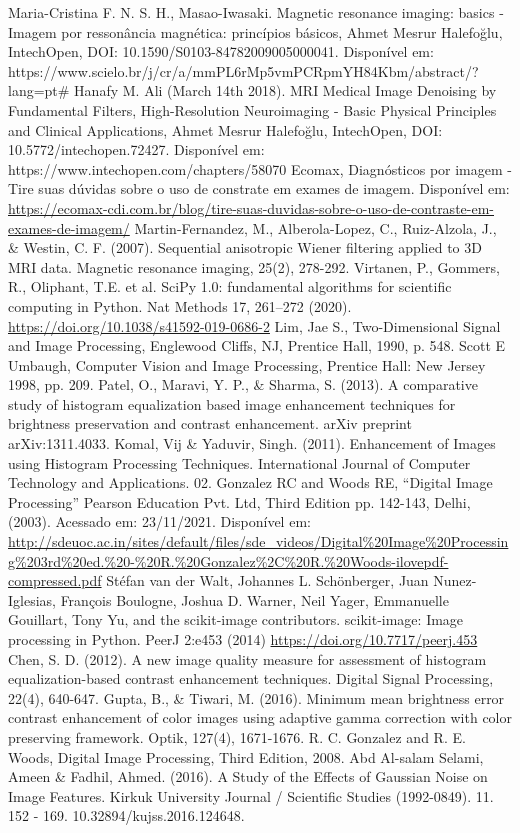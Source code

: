 \documentclass[conference]{IEEEtran}
\begin{document}
\begin{thebibliography}{00}
 Maria-Cristina F. N. S. H., Masao-Iwasaki. Magnetic resonance imaging: basics - Imagem por ressonância magnética: princípios básicos, Ahmet Mesrur Halefoğlu, IntechOpen, DOI: 10.1590/S0103-84782009005000041. Disponível em: https://www.scielo.br/j/cr/a/mmPL6rMp5vmPCRpmYH84Kbm/abstract/?lang=pt#
 Hanafy M. Ali (March 14th 2018). MRI Medical Image Denoising by Fundamental Filters, High-Resolution Neuroimaging - Basic Physical Principles and Clinical Applications, Ahmet Mesrur Halefoğlu, IntechOpen, DOI: 10.5772/intechopen.72427. Disponível em: https://www.intechopen.com/chapters/58070
 Ecomax, Diagnósticos por imagem - Tire suas dúvidas sobre o uso de constrate em exames de imagem. Disponível em: \url{https://ecomax-cdi.com.br/blog/tire-suas-duvidas-sobre-o-uso-de-contraste-em-exames-de-imagem/}
 Martin-Fernandez, M., Alberola-Lopez, C., Ruiz-Alzola, J., \& Westin, C. F. (2007). Sequential anisotropic Wiener filtering applied to 3D MRI data. Magnetic resonance imaging, 25(2), 278-292.
 Virtanen, P., Gommers, R., Oliphant, T.E. et al. SciPy 1.0: fundamental algorithms for scientific computing in Python. Nat Methods 17, 261–272 (2020). \url{https://doi.org/10.1038/s41592-019-0686-2}
 Lim, Jae S., Two-Dimensional Signal and Image Processing, Englewood Cliffs, NJ, Prentice Hall, 1990, p. 548.
 Scott E Umbaugh, Computer Vision and Image Processing, Prentice Hall: New Jersey 1998, pp. 209.
 Patel, O., Maravi, Y. P., \& Sharma, S. (2013). A comparative study of histogram equalization based image enhancement techniques for brightness preservation and contrast enhancement. arXiv preprint arXiv:1311.4033.
 Komal, Vij \& Yaduvir, Singh. (2011). Enhancement of Images using Histogram Processing Techniques. International Journal of Computer Technology and Applications. 02.
 Gonzalez RC and Woods RE, “Digital Image Processing” Pearson Education Pvt. Ltd, Third Edition pp. 142-143, Delhi, (2003). Acessado em: 23/11/2021. Disponível em: \url{http://sdeuoc.ac.in/sites/default/files/sde_videos/Digital%20Image%20Processing%203rd%20ed.%20-%20R.%20Gonzalez%2C%20R.%20Woods-ilovepdf-compressed.pdf}
 Stéfan van der Walt, Johannes L. Schönberger, Juan Nunez-Iglesias, François Boulogne, Joshua D. Warner, Neil Yager, Emmanuelle Gouillart, Tony Yu, and the scikit-image contributors. scikit-image: Image processing in Python. PeerJ 2:e453 (2014) \url{https://doi.org/10.7717/peerj.453}
 Chen, S. D. (2012). A new image quality measure for assessment of histogram equalization-based contrast enhancement techniques. Digital Signal Processing, 22(4), 640-647.
 Gupta, B., \& Tiwari, M. (2016). Minimum mean brightness error contrast enhancement of color images using adaptive gamma correction with color preserving framework. Optik, 127(4), 1671-1676.
 R. C. Gonzalez and R. E. Woods, Digital Image Processing, Third Edition,
2008.
 Abd Al-salam Selami, Ameen & Fadhil, Ahmed. (2016). A Study of the Effects of Gaussian Noise on Image Features. Kirkuk University Journal / Scientific Studies (1992-0849). 11. 152 - 169. 10.32894/kujss.2016.124648.
\end{thebibliography}
\vspace{12pt}
\end{document}
